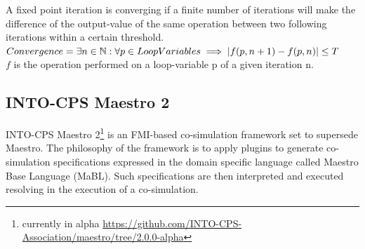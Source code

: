 \begin{definition}\label{def:convergence}
A fixed point iteration is converging if a finite number of iterations will make the difference of the output-value of the same operation between two following iterations within a certain threshold.\\
$Convergence = \exists n \in \mathbb{N}: \forall p \in LoopVariables \implies |f(p, n + 1) - f(p, n)| \leq T$\\
$f$ is the operation performed on a loop-variable p of a given iteration n.
\end{definition}


\subsection{INTO-CPS Maestro 2}
INTO-CPS Maestro 2\footnote{currently in alpha \url{https://github.com/INTO-CPS-Association/maestro/tree/2.0.0-alpha}}\cite{thule_maestro2_2019} is an FMI-based co-simulation framework set to supersede Maestro\cite{Maestro}. The philosophy of the framework is to apply plugins to generate co-simulation specifications expressed in the domain specific language called Maestro Base Language (MaBL). Such specifications are then interpreted and executed resolving in the execution of a co-simulation.
